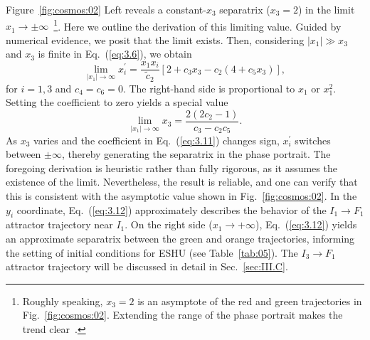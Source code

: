\documentclass[aps,prd,twocolumn]{revtex4-2}
\begin{document}
Figure~\ref{fig:cosmos:02} Left reveals a constant-$x_3$ separatrix ($x_3=2$) in the limit $x_1\rightarrow\pm\infty$~\footnote{Roughly speaking, $x_3=2$ is an asymptote of the red and green trajectories in Fig.~\ref{fig:cosmos:02}. Extending the range of the phase portrait makes the trend clear~\cite{NotShown}.}. Here we outline the derivation of this limiting value. Guided by numerical evidence, we posit that the limit exists. Then, considering $|x_1|\gg x_3$ and $x_3$ is finite in Eq.~(\ref{eq:3.6}), we obtain
\begin{equation}\label{eq:3.11}
  \lim_{|x_1|\rightarrow\infty} x_i^\prime = \frac{x_1x_i}{\tilde{c}_2}\left[2 + c_3x_3 - c_2(4+c_5x_3)\right],
\end{equation}
for $i=1,3$ and $c_4=c_6=0$. The right-hand side is proportional to $x_1$ or $x_1^2$. Setting the coefficient to zero yields a special value
\begin{equation}\label{eq:3.12}
  \lim_{|x_1|\rightarrow\infty} x_3 = \frac{2(2c_2-1)}{c_3-c_2c_5}.
\end{equation}
As $x_3$ varies and the coefficient in Eq.~(\ref{eq:3.11}) changes sign, $x_i^\prime$ switches between $\pm\infty$, thereby generating the separatrix in the phase portrait. The foregoing derivation is heuristic rather than fully rigorous, as it assumes the existence of the limit. Nevertheless, the result is reliable, and one can verify that this is consistent with the asymptotic value shown in Fig.~\ref{fig:cosmos:02}. In the $y_i$ coordinate, Eq.~(\ref{eq:3.12}) approximately describes the behavior of the $I_1\rightarrow F_1$ attractor trajectory near $I_1$. On the right side ($x_1\rightarrow+\infty$), Eq.~(\ref{eq:3.12}) yields an approximate separatrix between the green and orange trajectories, informing the setting of initial conditions for ESHU (see Table~\ref{tab:05}). The $I_3\rightarrow F_1$ attractor trajectory will be discussed in detail in Sec.~\ref{sec:III.C}.
\end{document}
